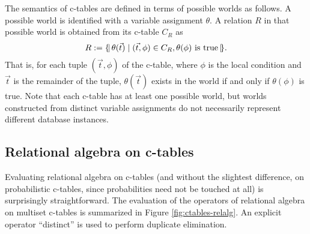The semantics  of c-tables are defined  in terms of  possible worlds as
follows.  A  possible world is  identified with a  variable assignment
$\theta$.  A relation $R$ in  that possible world is obtained from its
c-table $C_R$ as
$$R  :=  \{\!|\,  \theta(\vec{t})   \mid  (\vec{t},  \phi)  \in  C_R,
   \theta(\phi) \mbox{  is true} \,|\!\}.$$ That is,  for each tuple
   $(\vec{t},  \phi)$  of  the  c-table,  where $\phi$  is  the  local
   condition   and  $\vec{t}$   is   the  remainder   of  the   tuple,
   $\theta(\vec{t})$ exists in the world if and only if $\theta(\phi)$
   is true.  Note  that each c-table has at  least one possible world,
   but worlds  constructed from  distinct variable assignments  do not
   necessarily represent different database instances.



\subsection{Relational algebra on c-tables}


Evaluating relational algebra on c-tables (and without the slightest difference, on probabilistic c-tables, since probabilities need not be touched at all) is surprisingly straightforward. The evaluation of the operators of relational
algebra on multiset c-tables is summarized in Figure \ref{fig:ctables-relalg}.
An explicit operator ``distinct'' is used to perform duplicate elimination.  


